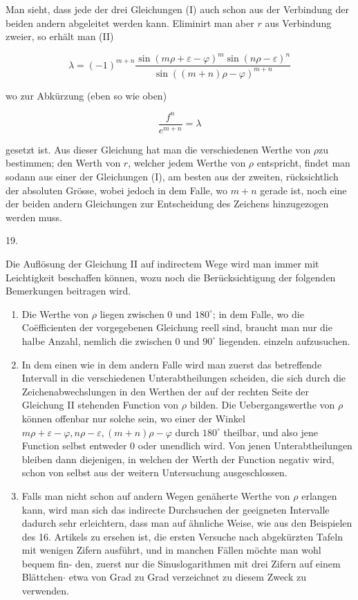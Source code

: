 \documentclass[10pt]{article}
\begin{document}
Man sieht, dass jede der drei Gleichungen (I) auch schon aus der Verbindung der beiden andern abgeleitet werden kann. Eliminirt man aber \(r\) aus Verbindung zweier, so erhält man (II)

\[
\lambda=(-1)^{m+n} \frac{\sin (m \rho+\varepsilon-\varphi)^{m} \sin (n \rho-\varepsilon)^{n}}{\sin ((m+n) \rho-\varphi)^{m+n}}
\]

wo zur Abkürzung (eben so wie oben)

\[
\frac{f^{n}}{e^{m+n}}=\lambda
\]

gesetzt ist. Aus dieser Gleichung hat man die verschiedenen Werthe von \(\rho \mathrm{zu}\) bestimmen; den Werth von \(r\), welcher jedem Werthe von \(\rho\) entspricht, findet man sodann aus einer der Gleichungen (I), am besten aus der zweiten, rücksichtlich der absoluten Grösse, wobei jedoch in dem Falle, wo \(m+n\) gerade ist, noch eine der beiden andern Gleichungen zur Entscheidung des Zeichens hinzugezogen werden muss.

19.

Die Auflösung der Gleichung II auf indirectem Wege wird man immer mit Leichtigkeit beschaffen können, wozu noch die Berücksichtigung der folgenden Bemerkungen beitragen wird.

\begin{enumerate}
  \item Die Werthe von \(\rho\) liegen zwischen 0 und \(180^{\circ}\); in dem Falle, wo die Coëfficienten der vorgegebenen Gleichung reell sind, braucht man nur die halbe Anzahl, nemlich die zwischen 0 und \(90^{\circ}\) liegenden. einzeln aufzusuchen.

  \item In dem einen wie in dem andern Falle wird man zuerst das betreffende Intervall in die verschiedenen Unterabtheilungen scheiden, die sich durch die Zeichenabwechslungen in den Werthen der auf der rechten Seite der Gleichung II stehenden Function von \(\rho\) bilden. Die Uebergangswerthe von \(\rho\) können offenbar nur solche sein, wo einer der Winkel \(m \rho+\varepsilon-\varphi, n \rho-\varepsilon,(m+n) \rho-\varphi\) durch \(180^{\circ}\) theilbar, und also jene Function selbst entweder 0 oder unendlich wird. Von jenen Unterabtheilungen bleiben dann diejenigen, in welchen der Werth der Function negativ wird, schon von selbst aus der weitern Untersuchung ausgeschlossen.

  \item Falls man nicht schon auf andern Wegen genäherte Werthe von \(\rho\) erlangen kann, wird man sich das indirecte Durchsuchen der geeigneten Intervalle dadurch sehr erleichtern, dass man auf ähnliche Weise, wie aus den Beispielen des 16. Artikels zu ersehen ist, die ersten Versuche nach abgekürzten Tafeln mit wenigen Zifern ausführt, und in manchen Fällen möchte man wohl bequem fin-
den, zuerst nur die Sinuslogarithmen mit drei Zifern auf einem Blättchen\(\cdot\) etwa von Grad zu Grad verzeichnet zu diesem Zweck zu verwenden.

\end{enumerate}
\end{document}

